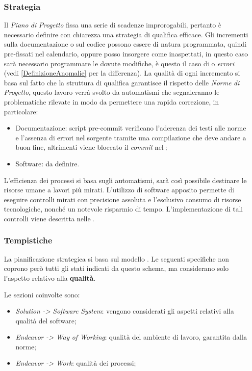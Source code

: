 		\subsubsection{Strategia}
		Il \emph{Piano di Progetto} fissa una serie di scadenze improrogabili, pertanto è necessario definire con chiarezza una strategia di qualifica efficace. Gli incrementi sulla documentazione o sul codice possono essere di natura programmata, quindi pre-fissati nel calendario, oppure posso insorgere come inaspettati, in questo caso sarà necessario programmare le dovute modifiche, è questo il caso di  o \emph{errori} (vedi \ref{DefinizioneAnomalie} per la differenza). La qualità di ogni incremento si basa sul fatto che la struttura di qualifica garantisce il rispetto delle \emph{Norme di Progetto}, questo lavoro verrà svolto da automatismi che segnaleranno le problematiche rilevate in modo da permettere una rapida correzione, in particolare:
		\begin{itemize}
			\item Documentazione: script pre-commit verificano l'aderenza dei testi alle norme e l'assenza di errori nel sorgente tramite una compilazione che deve andare a buon fine, altrimenti viene bloccato il \emph{commit} nel ;
			\item Software:  da definire.
		\end{itemize}
	L'efficienza dei processi si basa sugli automatismi, sarà così possibile destinare le risorse umane a lavori più mirati. L'utilizzo di software apposito permette di eseguire controlli mirati con precisione assoluta e l'esclusivo consumo di risorse tecnologiche, nonché un notevole risparmio di tempo. L'implementazione di tali controlli viene descritta nelle \NormeDiProgetto .\\
	
		\subsubsection{Tempistiche}
		La pianificazione strategica si basa sul modello . Le seguenti specifiche non coprono però tutti gli stati indicati da questo schema, ma considerano solo l'aspetto relativo alla \textbf{qualità}. 
		
		Le sezioni coinvolte sono:
			\begin{itemize}
				\item \emph{Solution -> Software System}: vengono considerati gli aspetti relativi alla qualità del software;
				\item \emph{Endeavor -> Way of Working}: qualità del ambiente di lavoro, garantita dalla norme;
				\item \emph{Endeavor -> Work}: qualità dei processi;
			\end{itemize}
		
